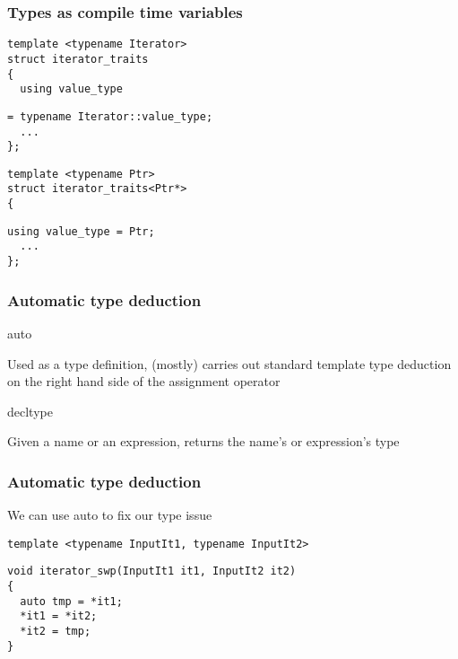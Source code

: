 \documentclass[14pt,a4paper,dvipsnames,usenames]{beamer}
\begin{document}
\begin{frame}[fragile]
  \frametitle{Types as compile time variables}

  \begin{lstlisting}
template <typename Iterator>
struct iterator_traits
{
  using value_type
  \end{lstlisting}
  \vspace*{-.4cm}
  \begin{lstlisting}[morekeywords={Iterator,value_type}]
    = typename Iterator::value_type;
  ...
};
  \end{lstlisting}
  \begin{lstlisting}
template <typename Ptr>
struct iterator_traits<Ptr*>
{
  \end{lstlisting}
  \vspace*{-.4cm}
  \begin{lstlisting}[morekeywords={Ptr}]
  using value_type = Ptr;
  ...
};
  \end{lstlisting}



\end{frame}

\begin{frame}
  \frametitle{Automatic type deduction}

  {\large\color{FeebleWeek}auto}
  
  \vspace{.1cm}
  Used as a type definition, {\fontsize{10pt}{10pt}\selectfont{}(mostly)} carries out standard template type deduction on the
  right hand side of the assignment operator

  \vspace{1cm}
  {\large\color{FeebleWeek}decltype}

  \vspace{.1cm}
  Given a name or an expression, returns the name's or expression's type
  
\end{frame}

\begin{frame}[fragile]
  \frametitle{Automatic type deduction}

  We can use {\color{FeebleWeek}auto} to fix our type issue

  \vspace{.5cm}
  \begin{lstlisting}
template <typename InputIt1, typename InputIt2>
  \end{lstlisting}
  \vspace*{-.4cm}
  \begin{lstlisting}[morekeywords={InputIt1,InputIt2,value_type}]
void iterator_swp(InputIt1 it1, InputIt2 it2)
{
  auto tmp = *it1;
  *it1 = *it2;
  *it2 = tmp;
}
  \end{lstlisting}

\end{frame}
\end{document}

